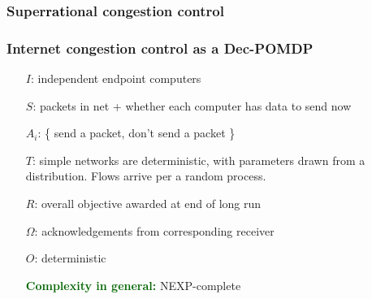 \documentclass[svgnames]{beamer}
\newcommand{\ssline}{\vspace{8 pt}}
\begin{document}
\begin{frame}
\frametitle{Super\textcolor{Black}{rat}ional congestion control}

\begin{centering}

\ssline
\ssline
\ssline

\end{centering}


\end{frame}

\begin{frame}
\frametitle{Internet congestion control as a Dec-POMDP}

\begin{itemize}

\item[$I$:] independent endpoint computers

\pause

\item[$S$:] packets in net + whether each computer has data to send now

\pause

\item[$A_i$:] \{ send a packet, don't send a packet \}

\pause

\item[$T$:] simple networks are deterministic, with parameters drawn from a distribution. Flows arrive per a random process.

\pause

\item[$R$:] overall objective awarded at end of long run

\pause

\item[$\Omega$:] acknowledgements from corresponding receiver

\pause

\item[$O$:] deterministic

\item[]

\pause

\item[] \textcolor{DarkGreen}{\textbf{Complexity in general:}} \textsc{NEXP}-complete

\end{itemize}

\end{frame}
\end{document}
